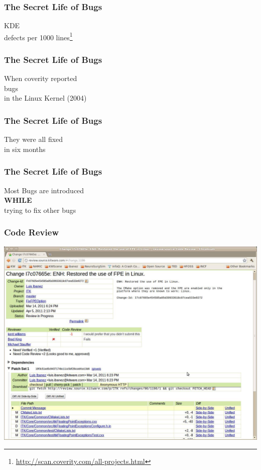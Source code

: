 \documentclass[18pt]{beamer}
\begin{document}
\begin{frame}
\frametitle{The Secret Life of Bugs}
\Huge
\begin{center}
KDE\\
 defects per 1000 lines\footnote{\url{http://scan.coverity.com/all-projects.html}}
\end{center}
\end{frame}


\begin{frame}
\frametitle{The Secret Life of Bugs}
\Huge
When coverity reported\\
 bugs\\
\pause
in the Linux Kernel (2004)\\
\end{frame}


\begin{frame}
\frametitle{The Secret Life of Bugs}
\Huge
They were all fixed\\
\pause
in six months\\
\end{frame}


\begin{frame}
\frametitle{The Secret Life of Bugs}
\Huge
Most Bugs are introduced\\
\bigskip
\pause
\textbf{WHILE}\\
\bigskip
trying to fix other bugs
\end{frame}


{
\begin{frame}
  \frametitle{Code Review}
  \includegraphics[width=\textwidth,height=\paperheight]{../Art/ITKGerritScreenShot.jpg}
\end{frame}
}
\end{document}
